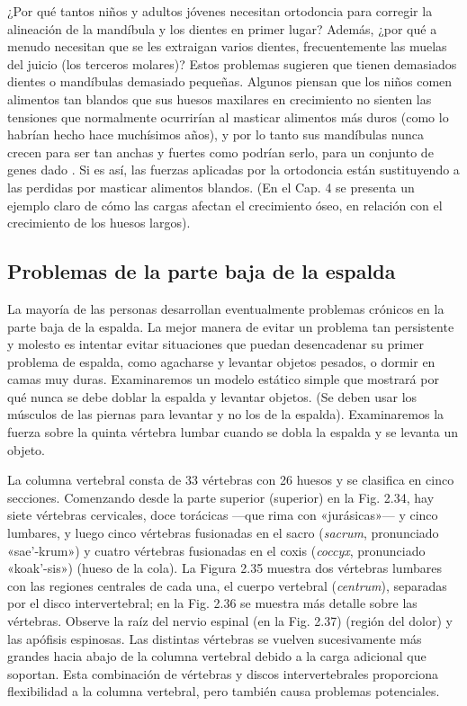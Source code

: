 \documentclass[12pt]{book}
\begin{document}
¿Por qué tantos niños y adultos jóvenes necesitan ortodoncia para corregir la alineación de la mandíbula y los dientes en primer lugar? Además, ¿por qué a menudo necesitan que se les extraigan varios dientes, frecuentemente las muelas del juicio (los terceros molares)? Estos problemas sugieren que tienen demasiados dientes o mandíbulas demasiado pequeñas. Algunos piensan que los niños comen alimentos tan blandos que sus huesos maxilares en crecimiento no sienten las tensiones que normalmente ocurrirían al masticar alimentos más duros (como lo habrían hecho hace muchísimos años), y por lo tanto sus mandíbulas nunca crecen para ser tan anchas y fuertes como podrían serlo, para un conjunto de genes dado \cite{16, 17}. Si es así, las fuerzas aplicadas por la ortodoncia están sustituyendo a las perdidas por masticar alimentos blandos. (En el Cap. 4 se presenta un ejemplo claro de cómo las cargas afectan el crecimiento óseo, en relación con el crecimiento de los huesos largos).

\subsection{Problemas de la parte baja de la espalda}

La mayoría de las personas desarrollan eventualmente problemas crónicos en la parte baja de la espalda. La mejor manera de evitar un problema tan persistente y molesto es intentar evitar situaciones que puedan desencadenar su primer problema de espalda, como agacharse y levantar objetos pesados, o dormir en camas muy duras. Examinaremos un modelo estático simple que mostrará por qué nunca se debe doblar la espalda y levantar objetos. (Se deben usar los músculos de las piernas para levantar y no los de la espalda). Examinaremos la fuerza sobre la quinta vértebra lumbar cuando se dobla la espalda y se levanta un objeto.

La columna vertebral consta de 33 vértebras con 26 huesos y se clasifica en cinco secciones. Comenzando desde la parte superior (superior) en la Fig. 2.34, hay siete vértebras cervicales, doce torácicas ---que rima con «jurásicas»--- y cinco lumbares, y luego cinco vértebras fusionadas en el sacro (\textit{sacrum}, pronunciado «sae'-krum») y cuatro vértebras fusionadas en el coxis (\textit{coccyx}, pronunciado «koak'-sis») (hueso de la cola). La Figura 2.35 muestra dos vértebras lumbares con las regiones centrales de cada una, el cuerpo vertebral (\textit{centrum}), separadas por el disco intervertebral; en la Fig. 2.36 se muestra más detalle sobre las vértebras. Observe la raíz del nervio espinal (en la Fig. 2.37) (región del dolor) y las apófisis espinosas. Las distintas vértebras se vuelven sucesivamente más grandes hacia abajo de la columna vertebral debido a la carga adicional que soportan. Esta combinación de vértebras y discos intervertebrales proporciona flexibilidad a la columna vertebral, pero también causa problemas potenciales.
\end{document}
